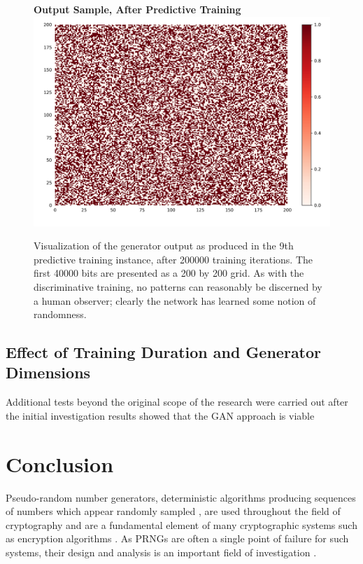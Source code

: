 \documentclass[12pt, titlepage]{report}
\theoremstyle{definition}
\begin{document}
\begin{figure}
\centering
\textbf{Output Sample, After Predictive Training}
\includegraphics[width=1\textwidth]{img/predictive_after}\\
\caption{Visualization of the generator output as produced in the 9th predictive training instance, after 200000 training iterations. The first 40000 bits are presented as a 200 by 200 grid. As with the discriminative training, no patterns can reasonably be discerned by a human observer; clearly the network has learned some notion of randomness.}
\label{figure:visualize_predictive_after}
\end{figure}


\section{Effect of Training Duration and Generator Dimensions}
Additional tests beyond the original scope of the research were carried out after the initial investigation results showed that the GAN approach is viable 


\chapter{Conclusion}\label{chapter:conclusion}
Pseudo-random number generators, deterministic algorithms producing sequences of numbers which appear randomly sampled \cite[p. 7]{barker2007recommendation}, are used throughout the field of cryptography and are a fundamental element of many cryptographic systems such as encryption algorithms  \cite[p. 169]{menezes1996handbook} \cite[p. 1]{kelsey1998cryptanalytic}. As PRNGs are often a single point of failure for such systems, their design and analysis is an important field of investigation \cite[p. 2]{kelsey1998cryptanalytic} \cite{deng2017developments}. 
\end{document}
